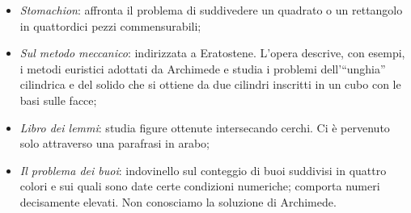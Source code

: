 \begin{itemize}
	\item \textit{Stomachion}: affronta il problema di suddivedere un quadrato o un rettangolo in quattordici pezzi commensurabili;
	\item \textit{Sul metodo meccanico}: indirizzata a Eratostene. L'opera descrive, con esempi, i metodi euristici adottati da Archimede e studia i problemi dell'``unghia'' cilindrica e del solido che si ottiene da due cilindri inscritti in un cubo con le basi sulle facce;
	\item \textit{Libro dei lemmi}: studia figure ottenute intersecando cerchi. Ci \`e pervenuto solo attraverso una parafrasi in arabo;
	\item \textit{Il problema dei buoi}: indovinello sul conteggio di buoi suddivisi in quattro colori e sui quali sono date certe condizioni numeriche; comporta numeri decisamente elevati. Non conosciamo la soluzione di Archimede.
\end{itemize}
